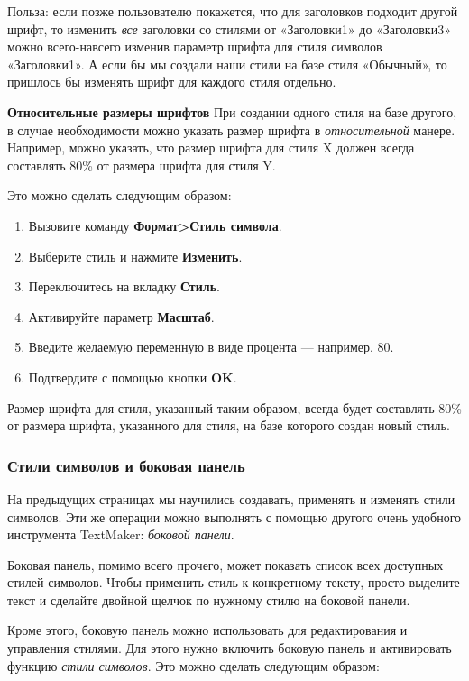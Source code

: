 ﻿\documentclass[a4paper,10pt]{article}
\begin{document}
Польза: если позже пользователю покажется, что для заголовков подходит другой шрифт, то изменить \textit{все} заголовки со стилями от «Заголовки1» до «Заголовки3» можно всего-навсего изменив параметр шрифта для стиля символов «Заголовки1». А если бы мы создали наши стили на базе стиля «Обычный», то пришлось бы изменять шрифт для каждого стиля отдельно.

\textbf{Относительные размеры шрифтов}
При создании одного стиля на базе другого, в случае необходимости можно указать размер шрифта в \textit{относительной} манере. Например, можно указать, что размер шрифта для стиля X должен всегда составлять 80\% от размера шрифта для стиля Y.

Это можно сделать следующим образом:
\begin{enumerate}
 \item Вызовите команду \textbf{Формат>Стиль символа}.
 \item Выберите стиль и нажмите \textbf{Изменить}.
 \item Переключитесь на вкладку \textbf{Стиль}.
 \item Активируйте параметр \textbf{Масштаб}.
 \item Введите желаемую переменную в виде процента — например, 80.
 \item Подтвердите с помощью кнопки \textbf{OK}.
\end{enumerate}

Размер шрифта для стиля, указанный таким образом, всегда будет составлять 80\% от размера шрифта, указанного для стиля, на базе которого создан новый стиль.

\subsubsection{Стили символов и боковая панель} \label{sec:стилисимвибокпанель}
На предыдущих страницах мы научились создавать, применять и изменять стили символов. Эти же операции можно выполнять с помощью другого очень удобного инструмента TextMaker: \textit{боковой панели}.

Боковая панель, помимо всего прочего, может показать список всех доступных стилей символов. Чтобы применить стиль к конкретному тексту, просто выделите текст и сделайте двойной щелчок по нужному стилю на боковой панели.

Кроме этого, боковую панель можно использовать для редактирования и управления стилями. Для этого нужно включить боковую панель и активировать функцию \textit{стили символов}. Это можно сделать следующим образом:
\end{document}
